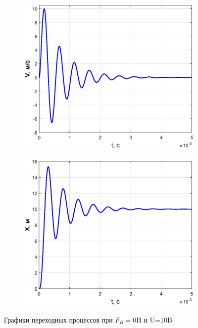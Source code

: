 \documentclass[12pt,a4paper]{article}
\begin{document}
\begin{figure}[H]
	\begin{subfigure}[b]{0.48\textwidth}
		\includegraphics[width = \textwidth]{V0}
	\end{subfigure}
	\hfill
	\begin{subfigure}[b]{0.48\textwidth}
		\includegraphics[width = \textwidth]{X0}
	\end{subfigure}
	\caption{Графики переходных процессов при $F_B=0$H и U=10B}
	\label{UFVX0}
\end{figure}
\end{document}
